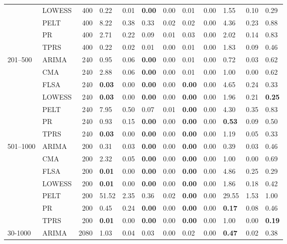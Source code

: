 \begin{table}[ht]
\begin{tabular}{llrlrlrlrlrl}
   & LOWESS & 400 & 0.22 & 0.01 & \textbf{0.00} & 0.00 & 0.01 & 0.00 & 1.55 & 0.10 & 0.29 \\ 
   & PELT & 400 & 8.22 & 0.38 & 0.33 & 0.02 & 0.02 & 0.00 & 4.36 & 0.23 & 0.88 \\ 
   & PR & 400 & 2.71 & 0.22 & 0.09 & 0.01 & 0.03 & 0.00 & 2.02 & 0.14 & 0.83 \\ 
   & TPRS & 400 & 0.22 & 0.02 & 0.01 & 0.00 & 0.01 & 0.00 & 1.83 & 0.09 & 0.46 \\ 
  201–500 & ARIMA & 240 & 0.95 & 0.06 & \textbf{0.00} & 0.00 & 0.01 & 0.00 & 0.72 & 0.03 & 0.62 \\ 
   & CMA & 240 & 2.88 & 0.06 & \textbf{0.00} & 0.00 & 0.01 & 0.00 & 1.00 & 0.00 & 0.62 \\ 
   & FLSA & 240 & \textbf{0.03} & 0.00 & \textbf{0.00} & 0.00 & \textbf{0.00} & 0.00 & 4.65 & 0.24 & 0.33 \\ 
   & LOWESS & 240 & \textbf{0.03} & 0.00 & \textbf{0.00} & 0.00 & \textbf{0.00} & 0.00 & 1.96 & 0.21 & \textbf{0.25} \\ 
   & PELT & 240 & 7.95 & 0.50 & 0.07 & 0.01 & \textbf{0.00} & 0.00 & 4.30 & 0.35 & 0.83 \\ 
   & PR & 240 & 0.93 & 0.15 & \textbf{0.00} & 0.00 & \textbf{0.00} & 0.00 & \textbf{0.53} & 0.09 & 0.50 \\ 
   & TPRS & 240 & \textbf{0.03} & 0.00 & \textbf{0.00} & 0.00 & \textbf{0.00} & 0.00 & 1.19 & 0.05 & 0.33 \\ 
  501–1000 & ARIMA & 200 & 0.31 & 0.03 & \textbf{0.00} & 0.00 & \textbf{0.00} & 0.00 & 0.39 & 0.03 & 0.46 \\ 
   & CMA & 200 & 2.32 & 0.05 & \textbf{0.00} & 0.00 & \textbf{0.00} & 0.00 & 1.00 & 0.00 & 0.69 \\ 
   & FLSA & 200 & \textbf{0.01} & 0.00 & \textbf{0.00} & 0.00 & \textbf{0.00} & 0.00 & 4.86 & 0.25 & 0.29 \\ 
   & LOWESS & 200 & \textbf{0.01} & 0.00 & \textbf{0.00} & 0.00 & \textbf{0.00} & 0.00 & 1.86 & 0.18 & 0.42 \\ 
   & PELT & 200 & 51.52 & 2.35 & 0.36 & 0.02 & \textbf{0.00} & 0.00 & 29.55 & 1.53 & 1.00 \\ 
   & PR & 200 & 0.45 & 0.24 & \textbf{0.00} & 0.00 & \textbf{0.00} & 0.00 & \textbf{0.17} & 0.08 & 0.46 \\ 
   & TPRS & 200 & \textbf{0.01} & 0.00 & \textbf{0.00} & 0.00 & \textbf{0.00} & 0.00 & 1.00 & 0.00 & \textbf{0.19} \\ 
  30-1000 & ARIMA & 2080 & 1.03 & 0.04 & 0.03 & 0.00 & 0.02 & 0.00 & \textbf{0.47} & 0.02 & 0.38 \\ 

\end{tabular}
\end{table}
